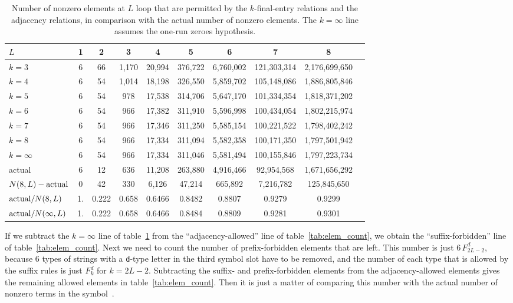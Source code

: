\documentclass[12pt]{article}
\begin{document}
\begin{table}[t]
    \small
    \centering
    \begin{tabular}{lccccccccc}
        \toprule
      $L$  & 1 & 2 & 3 & 4 & 5 & 6 & 7 & 8  \\
        \midrule
        $k=3$ & 6 & 66 & 1,170 & 20,994 & 376,722 & 6,760,002 & 121,303,314 & 2,176,699,650 \\
        $k=4$ & 6 & 54 & 1,014 & 18,198 & 326,550 & 5,859,702 & 105,148,086 & 1,886,805,846\\
        $k=5$ & 6 & 54 & 978 & 17,538 & 314,706 & 5,647,170 & 101,334,354 & 1,818,371,202\\ 
        $k=6$ & 6 & 54 & 966 & 17,382 & 311,910 & 5,596,998 & 100,434,054 & 1,802,215,974\\
        $k=7$ & 6 & 54 & 966 & 17,346 & 311,250 & 5,585,154 & 100,221,522 & 1,798,402,242\\
         $k=8$ & 6 & 54 & 966 & 17,334 & 311,094 & 5,582,358 & 100,171,350 & 1,797,501,942\\   
         $k=\infty$ & 6 & 54 & 966 & 17,334 & 311,046 & 5,581,494 & 100,155,846 & 1,797,223,734\\
         \bottomrule
   \hbox{actual} & 6 & 12 & 636 & 11,208 & 263,880 & 4,916,466 & 
          92,954,568 & 1,671,656,292\\
          \bottomrule
    $N(8,L)-\hbox{actual}$ & 0 & 42 & 330 & 6,126 & 47,214 & 665,892 & 7,216,782 & 125,845,650\\ 
    ${\rm actual}/N(8,L)$ & 1. & 0.222 & 0.658 & 0.6466 & 0.8482 & 
          0.8807 & 0.9279 & 0.9299\\
    ${\rm actual}/N(\infty,L)$ & 1. & 0.222 & 0.658 & 0.6466 & 0.8484 & 
          0.8809 & 0.9281 & 0.9301\\
       \bottomrule
    \end{tabular}
    \caption{\small Number of nonzero elements at $L$ loop that are permitted by the $k$-final-entry relations and the adjacency relations, in comparison with the actual number of nonzero elements. The $k=\infty$ line assumes the one-run zeroes hypothesis.}
    \label{tab:k_allowed}
\end{table}

If we subtract the $k=\infty$ line of table~\ref{tab:k_allowed} from the ``adjacency-allowed'' line of table~\ref{tab:elem_count}, we obtain the ``suffix-forbidden'' line of table~\ref{tab:elem_count}.  Next we need to count the number of prefix-forbidden elements that are left.  This number is just $6\,F_{2L-2}^d$, because 6 types of strings with a {\tt d}-type letter in the third symbol slot have to be removed, and the number of each type that is allowed by the suffix rules is just $F_{k}^d$ for $k=2L-2$. Subtracting the suffix- and prefix-forbidden elements from the adjacency-allowed elements gives the remaining allowed elements in table~\ref{tab:elem_count}.  Then it is just a matter of comparing this number with the actual number of nonzero terms in the symbol~\citep{Dixon:2021tdw}.
\end{document}
